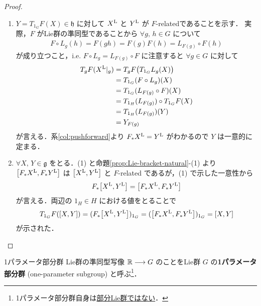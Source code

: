 \documentclass[geometry_main]{subfiles}
\begin{document}
\begin{proof}
    \begin{enumerate}
        \item $Y = T_{1_G} F(X) \in \mathfrak{h}$ に対して $X^{\mathrm{L}}$ と $Y^{\mathrm{L}}$ が $F$-relatedであることを示す．
        実際，$F$ がLie群の準同型であることから
        $\forall g,\, h \in G$ について
        \begin{align}
            F \circ L_g (h) = F(gh) = F(g)F(h) = L_{F(g)} \circ F(h)
        \end{align}
        が成り立つこと，i.e. $F \circ L_g = L_{F(g)} \circ F$ に注意すると
        $\forall g \in G$ に対して
        \begin{align}
            T_g F (X^{\mathrm{L}}|_g) &= T_g F \bigl( T_{1_G} L_g(X) \bigr) \\
            &= T_{1_G}(F \circ L_g)(X) \\
            &= T_{1_G}(L_{F(g)} \circ F)(X) \\
            &= T_{1_H}(L_{F(g)}) \circ T_{1_G} F(X) \\
            &= T_{1_H}(L_{F(g)})(Y) \\
            &= Y_{F(g)}
        \end{align}
        が言える．系\ref{col:pushforward}より $F_* X^{\mathrm{L}} = Y^{\mathrm{L}}$ がわかるので $Y$ は一意的に定まる．
        \item $\forall X,\, Y \in \mathfrak{g}$ をとる．(1) と命題\ref{prop:Lie-bracket-natural}-(1) より $\comm{F_* \Lie{X}}{F_* \Lie{Y}}$ は $\comm{\Lie{X}}{\Lie{Y}}$ と $F$-related であるが，(1) で示した一意性から
        \begin{align}
            F_*\comm{\Lie{X}}{\Lie{Y}} = \comm{F_* \Lie{X}}{F_* \Lie{Y}}
        \end{align}
        が言える．両辺の $1_H \in H$ における値をとることで
        \begin{align}
            T_{1_G}F (\comm{X}{Y}) = (F_*\comm{\Lie{X}}{\Lie{Y}})_{1_G} = (\comm{F_* \Lie{X}}{F_* \Lie{Y}})_{1_G} = \comm{X}{Y}
        \end{align}
        が示された．
    \end{enumerate}
\end{proof}


\begin{mydef}[label=def:one-parameter-subgroup]{1パラメータ部分群}
    Lie群の準同型写像 $\mathbb{R} \longrightarrow G$ のことをLie群 $G$ の\textbf{1パラメータ部分群} (one-parameter subgroup) と呼ぶ\footnote{1パラメータ部分群自身は\underline{部分Lie群ではない}．}．
\end{mydef}
\end{document}
